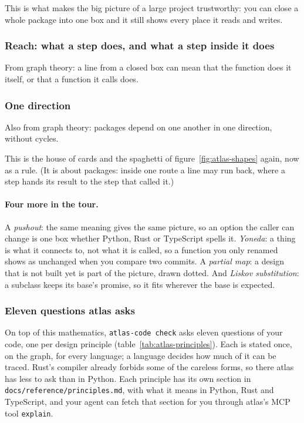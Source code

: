 \documentclass[12pt, a4paper]{article}
\theoremstyle{definition}
\theoremstyle{remark}
\begin{document}
This is what makes the big picture of a large project trustworthy: you can close a whole package into one box and it still shows every place it reads and writes.

\subsubsection{Reach: what a step does, and what a step inside it does}
From graph theory: a line from a closed box can mean that the function does it itself, or that a function it calls does.


\subsubsection{One direction}
Also from graph theory: packages depend on one another in one direction, without cycles.


This is the house of cards and the spaghetti of figure~\ref{fig:atlas-shapes} again, now as a rule. (It is about packages: inside one route a line may run back, where a step hands its result to the step that called it.)

\paragraph{Four more in the tour.}
A \emph{pushout}: the same meaning gives the same picture, so an option the caller can change is one box whether Python, Rust or TypeScript spells it. \emph{Yoneda}: a thing is what it connects to, not what it is called, so a function you only renamed shows as unchanged when you compare two commits. A \emph{partial map}: a design that is not built yet is part of the picture, drawn dotted. And \emph{Liskov substitution}: a subclass keeps its base's promise, so it fits wherever the base is expected.

\subsubsection{Eleven questions atlas asks}
On top of this mathematics, \texttt{atlas-code check} asks eleven questions of your code, one per design principle (table~\ref{tab:atlas-principles}). Each is stated once, on the graph, for every language; a language decides how much of it can be traced. Rust's compiler already forbids some of the careless forms, so there atlas has less to ask than in Python. Each principle has its own section in \texttt{docs/reference/principles.md}, with what it means in Python, Rust and TypeScript, and your agent can fetch that section for you through atlas's MCP tool \texttt{explain}.
\end{document}
